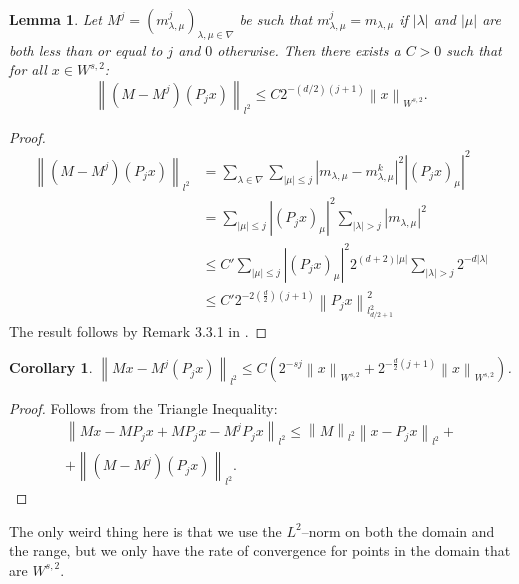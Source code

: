 \documentclass[12pt]{amsart}
\newtheorem{corollary}{Corollary}
\newtheorem{lemma}{Lemma}
\newcommand{\card}[1]{{\lvert#1\rvert}}
\newcommand{\abs}[1]{\ensuremath{\left\lvert #1\right\rvert}}
\newcommand{\norm}[1]{\ensuremath{\left\lVert #1\right\rVert}}
\begin{document}
\begin{lemma}
	Let $M^j=(m^j_{\lambda,\mu})_{\lambda,\mu \in \nabla}$ be such that $m^j_{\lambda,\mu} = m_{\lambda,\mu}$ if $\card{\lambda}$ and $\card{\mu}$ are both less than or equal to $j$ and $0$ otherwise. Then there exists a $C > 0$ such that for all $x \in W^{s,2}$:
	\begin{equation}
		\norm{(M-M^j)(P_jx)}_{l^2} \leq C2^{-(d/2)(j+1)} \norm{x}_{W^{s,2}}.
	\end{equation}
\end{lemma}
\begin{proof}
	\begin{align}
		\norm{(M-M^j)(P_j x)}_{l^2} &= \sum_{\lambda \in \nabla} \sum_{\card{\mu}\leq j} \abs{m_{\lambda,\mu}-m^k_{\lambda,\mu}}^2 \abs{(P_j x)_\mu}^2 \\
		&= \sum_{\card{\mu}\leq j}\abs{(P_j x)_\mu}^2 \sum_{\card{\lambda}>j}\abs{m_{\lambda,\mu}}^2 \\
		&\leq C'\sum_{\card{\mu}\leq j}\abs{(P_j x)_\mu}^2 2^{(d+2)\card{\mu}}\sum_{\card{\lambda}>j}2^{-d\card{\lambda}} \\
		&\leq C' 2^{-2(\frac{d}{2})(j+1)}\norm{P_j x}^2_{l^2_{d/2+1}}
	\end{align}
	The result follows by Remark 3.3.1 in \cite{}.
\end{proof}

\begin{corollary}
	$\norm{Mx - M^j(P_j x)}_{l^2} \leq C \left( 2^{-sj}\norm{x}_{W^{s,2}} + 2^{-\frac{d}{2}(j+1)}\norm{x}_{W^{s,2}} \right)$.
\end{corollary}
\begin{proof}
	Follows from the Triangle Inequality:
	\begin{multline}
		\norm{Mx - M P_j x + M P_j x - M^j P_j x}_{l^2} \leq \norm{M}_{l^2} \norm{x - P_j x}_{l^2} + \\ + \norm{(M-M^j)(P_jx)}_{l^2}.
	\end{multline}
\end{proof}

The only weird thing here is that we use the $L^2$--norm on both the domain and the range, but we only have the rate of convergence for points in the domain that are $W^{s,2}$.
\end{document}
